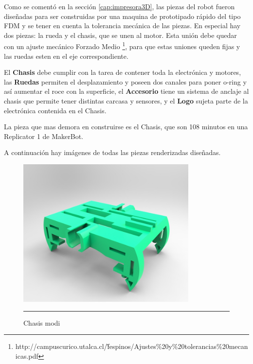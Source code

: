 Como se comentó en la sección \ref{cap:impresora3D}, las piezas del robot fueron diseñadas para ser construidas por una maquina de prototipado rápido del tipo FDM y se tener en cuenta la tolerancia mecánica de las piezas. En especial hay dos piezas: la rueda y el chasis, que se unen al motor. Esta unión debe quedar con un ajuste mecánico Forzado Medio \footnote{http://campuscurico.utalca.cl/\~ fespinos/Ajustes\%20y\%20tolerancias\%20mecanicas.pdf}, para que estas uniones queden fijas y las ruedas esten en el eje correspondiente.

El \textbf{Chasis} debe cumplir con la tarea de contener toda la electrónica y motores, las \textbf{Ruedas} permiten el desplazamiento y poseen dos canales para poner o-ring y así aumentar el roce con la superficie, el \textbf{Accesorio} tiene un sistema de anclaje al chasis que permite tener distintas carcasa y sensores, y el \textbf{Logo} sujeta parte de la electrónica contenida en el Chasis. 

La pieza que mas demora en construirse es el Chasis, que son 108 minutos en una Replicator 1 de MakerBot.

A continuación hay imágenes de todas las piezas renderizadas diseñadas.
\begin{figure}[htbp]
	\centering
		\includegraphics[width=0.8\textwidth]{./Figures/MODI/chasismodi.jpg}
		\rule{35em}{0.5pt}
	\caption[chasismodi]{Chasis modi}
	\label{fig:chasismodi}
\end{figure}

